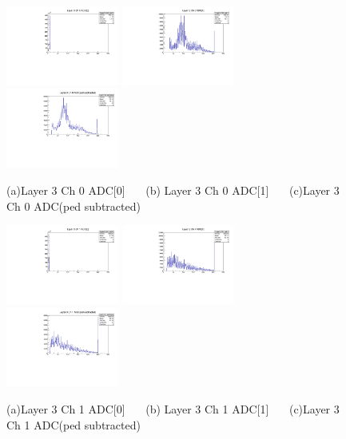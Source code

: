 \documentclass[a4paper,11pt]{article}
\theoremstyle{mytheor}
\begin{document}
\begin{figure}[H] 
\vspace*{-0.3cm} 
\includegraphics[width=0.33\textwidth,scale=0.5,trim=0 0 0 0,clip]{plotsdir/file0_test-Layer3_Ch0_adc0-1.pdf} 
\includegraphics[width=0.33\textwidth,scale=0.5,trim=0 0 0 0,clip]{plotsdir/file0_test-Layer3_Ch0_adc1-1.pdf} 
\includegraphics[width=0.33\textwidth,scale=0.5,trim=0 0 0 0,clip]{plotsdir/file0_test-Layer3_Ch0_adcPedsub-1.pdf} 
\caption{(a)Layer 3 Ch 0 ADC[0] ~~~(b) Layer 3 Ch 0 ADC[1] ~~~(c)Layer 3 Ch 0 ADC(ped subtracted) } 
\end{figure} 
\begin{figure}[H] 
\vspace*{-0.3cm} 
\includegraphics[width=0.33\textwidth,scale=0.5,trim=0 0 0 0,clip]{plotsdir/file0_test-Layer3_Ch1_adc0-1.pdf} 
\includegraphics[width=0.33\textwidth,scale=0.5,trim=0 0 0 0,clip]{plotsdir/file0_test-Layer3_Ch1_adc1-1.pdf} 
\includegraphics[width=0.33\textwidth,scale=0.5,trim=0 0 0 0,clip]{plotsdir/file0_test-Layer3_Ch1_adcPedsub-1.pdf} 
\caption{(a)Layer 3 Ch 1 ADC[0] ~~~(b) Layer 3 Ch 1 ADC[1] ~~~(c)Layer 3 Ch 1 ADC(ped subtracted) } 
\end{figure} 
\end{document}
